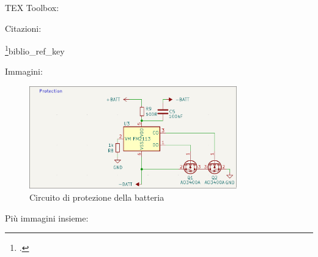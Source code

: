 TEX Toolbox: 

Citazioni:

\cite{riscv}
\footcite{Small description}{biblio_ref_key}

Immagini:

\begin{figure}[H]
  \centering
  \includegraphics[width=0.8\textwidth]{images/chapter2/protection.png}
  \caption{Circuito di protezione della batteria}
  \label{fig:protection}
\end{figure}

Più immagini insieme:

